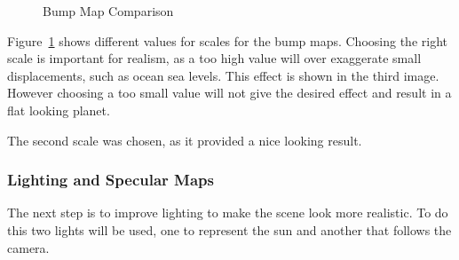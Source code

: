 \documentclass[]{article}
\begin{document}
\begin{figure}[H]
    \centering
    \qquad
    \qquad
    \qquad
    \caption{Bump Map Comparison}
    \label{fig:bumpmap}
\end{figure}

Figure~\ref{fig:bumpmap} shows different values for scales for the bump maps.
Choosing the right scale is important for realism, as a too high value will over exaggerate small displacements,
such as ocean sea levels.
This effect is shown in the third image.
However choosing a too small value will not give the desired effect and result in a flat looking planet.

The second scale was chosen, as it provided a nice looking result.

\subsubsection{Lighting and Specular Maps}

The next step is to improve lighting to make the scene look more realistic.
To do this two lights will be used, one to represent the sun and another that follows the camera.
\end{document}

